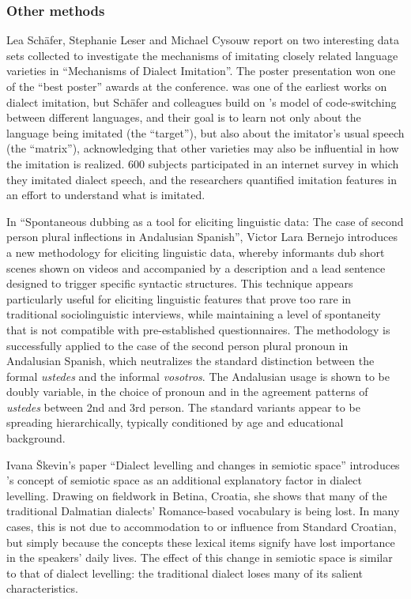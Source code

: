 \documentclass[output=paper]{LSP/langsci}
\begin{document}
\subsubsection{Other methods}
Lea Schäfer, Stephanie Leser and Michael Cysouw report on two interesting data sets collected to investigate the mechanisms of imitating closely related language varieties in “Mechanisms of Dialect Imitation”. The poster presentation won one of the “best poster” awards at the conference. \citet{purschke_regionalsprache_2011} was one of the earliest works on dialect imitation, but Schäfer and colleagues build on \citeauthor{myers-scotton_duelling_1993}'s \citeyearpar{myers-scotton_duelling_1993} model of code-switching between different languages, and their goal is to learn not only about the language being imitated (the “target”), but also about the imitator’s usual speech (the “matrix”), acknowledging that other varieties may also be influential in how the imitation is realized. 600 subjects participated in an internet survey in which they imitated dialect speech, and the researchers quantified imitation features in an effort to understand what is imitated.

In “Spontaneous dubbing as a tool for eliciting linguistic data: The case of second person plural inflections in Andalusian Spanish”, Victor Lara Bernejo introduces a new methodology for eliciting linguistic data, whereby informants dub short scenes shown on videos and accompanied by a description and a lead sentence designed to trigger specific syntactic structures. This technique appears particularly useful for eliciting linguistic features that prove too rare in traditional sociolinguistic interviews, while maintaining a level of spontaneity that is not compatible with pre-established questionnaires. The methodology is successfully applied to the case of the second person plural pronoun in Andalusian Spanish, which neutralizes the standard distinction between the formal \textit{ustedes} and the informal \textit{vosotros}. The Andalusian usage is shown to be doubly variable, in the choice of pronoun and in the agreement patterns of \textit{ustedes} between 2nd and 3rd person. The standard variants appear to be spreading hierarchically, typically conditioned by age and educational background. 

Ivana Škevin’s paper “Dialect levelling and changes in semiotic space” introduces \citeauthor{lotman_semiosphere_1985}’s \citeyearpar{lotman_semiosphere_1985} concept of semiotic space as an additional explanatory factor in dialect levelling. Drawing on fieldwork in Betina, Croatia, she shows that many of the traditional Dalmatian dialects’ Romance-based vocabulary is being lost. In many cases, this is not due to accommodation to or influence from Standard Croatian, but simply because the concepts these lexical items signify have lost importance in the speakers’ daily lives. The effect of this change in semiotic space is similar to that of dialect levelling: the traditional dialect loses many of its salient characteristics.
\end{document}
